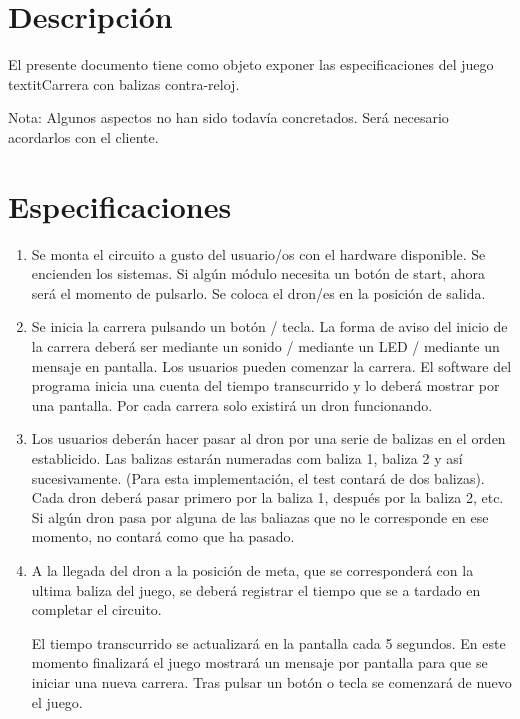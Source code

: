 \section{Descripción}
El presente documento tiene como objeto exponer las especificaciones del juego textit{Carrera con balizas contra-reloj}.

Nota: Algunos aspectos no han sido todavía concretados. Será necesario acordarlos con el cliente. 

\section{Especificaciones}
\begin{enumerate}[1.]
    \item Se monta el circuito a gusto del usuario/os con el hardware disponible. Se encienden los sistemas. Si algún módulo necesita un botón de start, ahora será el momento de pulsarlo. Se coloca el dron/es en la posición de salida.
    \item Se inicia la carrera pulsando un botón / tecla. La forma de aviso del inicio de la carrera deberá ser mediante un sonido / mediante un LED / mediante un mensaje en pantalla. Los usuarios pueden comenzar la carrera. El software del programa inicia una cuenta del tiempo transcurrido y lo deberá mostrar por una pantalla. Por cada carrera solo existirá un dron funcionando.
    \item Los usuarios deberán hacer pasar al dron por una serie de balizas en el orden establicido. Las balizas estarán numeradas com baliza 1, baliza 2 y así sucesivamente. (Para esta implementación, el test contará de dos balizas). Cada dron deberá pasar primero por la baliza 1, después por la baliza 2, etc. Si algún dron pasa por alguna de las baliazas que no le corresponde en ese momento, no contará como que ha pasado.
    \item A la llegada del  dron a la posición de meta, que se corresponderá con la ultima baliza del juego, se deberá registrar el tiempo que se a tardado en completar el circuito. 
	
El tiempo transcurrido se actualizará  en la pantalla cada 5 segundos.
En este momento finalizará el juego mostrará un mensaje por pantalla para que se iniciar una nueva carrera. Tras pulsar un botón o tecla se comenzará de nuevo el juego.
\end{enumerate}